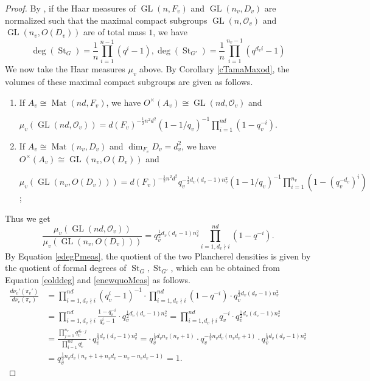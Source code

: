 \documentclass[11pt]{article}
\theoremstyle{plain}
\theoremstyle{remark}
\theoremstyle{definition}
\DeclareMathOperator{\GL}{GL}
\DeclareMathOperator{\St}{St}
\DeclareMathOperator{\Mt}{Mat}
\begin{document}
\begin{proof}
By \cite[\S 2]{CMS90}, if the Haar measures of $\GL(n,F_v)$ and $\GL(n_v,D_v)$ are normalized such that the maximal compact subgroups $\GL(n,\mathcal{O}_v)$ and $\GL(n_v,O(D_v))$ are of total mass $1$, we have
\begin{equation}\label{eolddeg}
    \deg(\St_G)=\frac{1}{n}\prod_{i=1}^{n-1}(q^{i}-1),\deg(\St_{G'})=\frac{1}{n}\prod_{i=1}^{n_v-1}(q^{d_{v}i}-1)
\end{equation}
We now take the Haar measures $\mu_v$ above. 
By Corollary \ref{cTamaMaxod}, the volumes of these maximal compact subgroups are given as follows.
\begin{enumerate}
\item If $A_v\cong \Mt(nd,F_v)$, we have $O^{\times}(A_v)\cong \GL(nd,\mathcal{O}_v)$ and 
    \begin{center}
        $\mu_v(\GL(nd,\mathcal{O}_v))=d(F_v)^{-\frac{1}{2}n^2d^2}(1-1/q_v)^{-1}\prod_{i=1}^{nd}(1-q_v^{-i})$. 
    \end{center}
\item If $A_v\cong \Mt(n_v,D_v)$ and $\dim_{F_v}D_v=d_v^2$, we have $O^{\times}(A_v)\cong \GL(n_v,O(D_v))$ and
    \begin{center}
        $\mu_v(\GL(n_v,O(D_v)))=d(F_v)^{-\frac{1}{2}n^2d^2}q_v^{-\frac{1}{2}d_{v}(d_{v}-1)n_v^2}(1-1/q_v)^{-1}\prod_{i=1}^{n_v}(1-(q_v^{-d_v})^i)$; 
    \end{center}
    
\end{enumerate}
Thus we get
\begin{equation}\label{enewquoMeas}
    \frac{\mu_v(\GL(nd,\mathcal{O}_v))}{\mu_v(\GL(n_v,O(D_v)))}=q_v^{\frac{1}{2}d_{v}(d_{v}-1)n_v^2}\prod_{i=1,d_v\nmid i}^{nd}(1-q^{-i}).
\end{equation}
By Equation \eqref{edegPmeas}, the quotient of the two Plancherel densities is given by the quotient of formal degrees of $\St_{G},\St_{G'}$, which can be obtained from Equation \eqref{eolddeg} and \eqref{enewquoMeas} as follows. 
\begin{equation*}
\begin{aligned}
    \frac{d \nu_v'(\pi_v')}{d \nu_v(\pi_v)}&=\prod_{i=1,d_v\nmid i}^{nd}(q_v^i -1)^{-1} \cdot \prod_{i=1,d_v\nmid i}^{nd}(1-q^{-i})\cdot q_v^{\frac{1}{2}d_{v}(d_{v}-1)n_v^2}\\
    &=\prod_{i=1,d_v\nmid i}^{nd}\frac{1-q_v^{-i}}{q_v^i-1}\cdot q_v^{\frac{1}{2}d_{v}(d_{v}-1)n_v^2} =\prod_{i=1,d_v\nmid i}^{nd}q_{v}^{-i}\cdot q_v^{\frac{1}{2}d_{v}(d_{v}-1)n_v^2}\\
    &=\frac{\prod_{j=1}^{n_v}q_{v}^{d_v\cdot j}}{\prod_{i=1}^{nd}q_{v}^{i}}\cdot q_v^{\frac{1}{2}d_{v}(d_{v}-1)n_v^2}=q_v^{\frac{1}{2}d_{v}n_{v}(n_{v}+1)}\cdot q_v^{-\frac{1}{2}n_{v}d_{v}(n_{v}d_{v}+1)}\cdot q_v^{\frac{1}{2}d_{v}(d_{v}-1)n_v^2}\\&=
    q_v^{\frac{1}{2}n_{v}d_{v}(n_{v}+1+n_{v}d_{v}-n_{v}-n_{v}d_{v}-1)}=1.
\end{aligned}
\end{equation*}
\end{proof}
\end{document}
